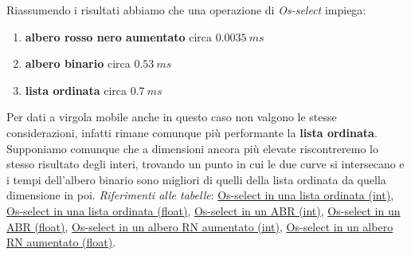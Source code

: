 \documentclass[onecolumn]{article}
\begin{document}
Riassumendo i risultati abbiamo che una operazione di \textit{Os-select} impiega:
\begin{enumerate}
    \item \textbf{albero rosso nero aumentato} circa \(0.0035\:ms\)
    \item \textbf{albero binario} circa \(0.53\:ms\)
    \item \textbf{lista ordinata} circa \(0.7\:ms\)
\end{enumerate}

Per dati a virgola mobile anche in questo caso non valgono le stesse considerazioni, infatti rimane comunque più performante la \textbf{lista ordinata}. Supponiamo comunque che a dimensioni ancora più elevate riscontreremo lo stesso risultato degli interi, trovando un punto in cui le due curve si intersecano e i tempi dell'albero binario sono migliori di quelli della lista ordinata da quella dimensione in poi.
\newline
\newline
\textit{Riferimenti alle tabelle}: \hyperref[label:lista-ordinata-l-os-select]{Os-select in una lista ordinata (int)}, \hyperref[label:lista-ordinata-l-float-os-select]{Os-select in una lista ordinata (float)}, \hyperref[label:abr-l-os-select]{Os-select in un ABR (int)}, \hyperref[label:abr-l-float-os-select]{Os-select in un ABR (float)}, \hyperref[label:rn-aumentato-l-os-select]{Os-select in un albero RN aumentato (int)}, \hyperref[label:rn-aumentato-l-float-os-select]{Os-select in un albero RN aumentato (float)}.
\end{document}
